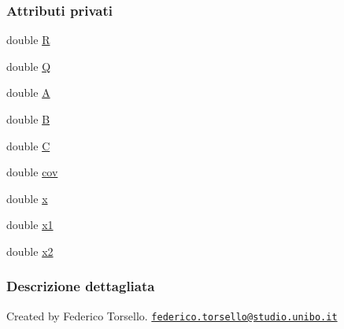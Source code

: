 \subsubsection*{Attributi privati}
\begin{DoxyCompactItemize}
\item 
double \hyperlink{classit_1_1unibo_1_1torsello_1_1bluetoothpositioning_1_1kalmanFilter_1_1KFilter_a8dd220ba0a0b0f20c368b13efeb1fe43_a8dd220ba0a0b0f20c368b13efeb1fe43}{R}
\item 
double \hyperlink{classit_1_1unibo_1_1torsello_1_1bluetoothpositioning_1_1kalmanFilter_1_1KFilter_a454b23b79e09bb12edbc9175e6ba17e9_a454b23b79e09bb12edbc9175e6ba17e9}{Q}
\item 
double \hyperlink{classit_1_1unibo_1_1torsello_1_1bluetoothpositioning_1_1kalmanFilter_1_1KFilter_a1f75be34a39e81ee7566035f9a8ff11e_a1f75be34a39e81ee7566035f9a8ff11e}{A}
\item 
double \hyperlink{classit_1_1unibo_1_1torsello_1_1bluetoothpositioning_1_1kalmanFilter_1_1KFilter_a6ed97dcc6105d1c64478b1a22bf800bc_a6ed97dcc6105d1c64478b1a22bf800bc}{B}
\item 
double \hyperlink{classit_1_1unibo_1_1torsello_1_1bluetoothpositioning_1_1kalmanFilter_1_1KFilter_a850cd09cf3a3a8ee28e16636069cb9a0_a850cd09cf3a3a8ee28e16636069cb9a0}{C}
\item 
double \hyperlink{classit_1_1unibo_1_1torsello_1_1bluetoothpositioning_1_1kalmanFilter_1_1KFilter_a2c0a42b4dbe4de0e2a34046b9dc8eb3b_a2c0a42b4dbe4de0e2a34046b9dc8eb3b}{cov}
\item 
double \hyperlink{classit_1_1unibo_1_1torsello_1_1bluetoothpositioning_1_1kalmanFilter_1_1KFilter_aa6f9d5594f6870767679dbb79e40918d_aa6f9d5594f6870767679dbb79e40918d}{x}
\item 
double \hyperlink{classit_1_1unibo_1_1torsello_1_1bluetoothpositioning_1_1kalmanFilter_1_1KFilter_ac6a114b47e572ccdfb7b1df2aa77c190_ac6a114b47e572ccdfb7b1df2aa77c190}{x1}
\item 
double \hyperlink{classit_1_1unibo_1_1torsello_1_1bluetoothpositioning_1_1kalmanFilter_1_1KFilter_a45faa12a35825dd4bd104e1cbeeaf609_a45faa12a35825dd4bd104e1cbeeaf609}{x2}
\end{DoxyCompactItemize}


\subsubsection{Descrizione dettagliata}
Created by Federico Torsello. \href{mailto:federico.torsello@studio.unibo.it}{\tt federico.\+torsello@studio.\+unibo.\+it} 

